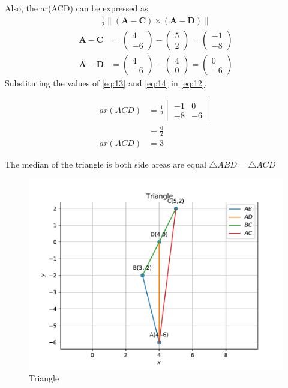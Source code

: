 \documentclass[12pt]{article}
\newcommand{\mydet}[1]{\ensuremath{\begin{vmatrix}#1\end{vmatrix}}}
\providecommand{\brak}[1]{\ensuremath{\left(#1\right)}}
\newcommand{\myvec}[1]{\ensuremath{\begin{pmatrix}#1\end{pmatrix}}}
\providecommand{\norm}[1]{\left\lVert#1\right\rVert}
\let\vec\mathbf
\begin{document}
		Also, the ar(ACD) can be expressed as
  \begin{align}
  \frac{1}{2} \norm{\brak{\vec{A}-\vec{C}}  \times 
   \brak{\vec{A}- \vec{D}}} \label{eq:12}
\end{align}
\begin{align}
	\vec{A}- \vec{C} &= \myvec{4\\ -6}-\myvec{5\\ 2}=\myvec{-1\\ -8}\label{eq:13} \\
	  \vec{A}- \vec{D} &= \myvec{4\\ -6}-\myvec{4\\ 0}=\myvec{0\\ -6}\label{eq:14} 
  \end{align}
		Substituting the values of \eqref{eq:13} and \eqref{eq:14} in \eqref{eq:12},

		\begin{align}
	ar(ACD)&=\frac{1}{2}\mydet{-1 & 0\\-8 & -6}\\ 
	       &=\frac{6}{2}\\
	ar(ACD)&= 3
\end{align}
		
The median of the triangle is  both side areas are equal $\triangle ABD=\triangle ACD$
\begin{figure}[h!]
\centering
\includegraphics[width=\columnwidth]{fig.pdf}
\caption{Triangle}
\label{fig-}
\end{figure} 
\end{document}
